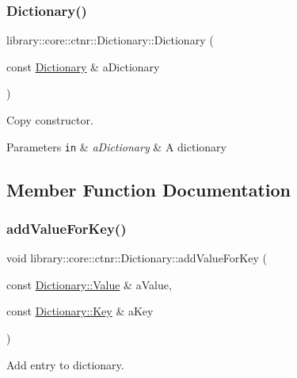 \subsubsection{\texorpdfstring{Dictionary()}{Dictionary()}\hspace{0.1cm}{\footnotesize\ttfamily [2/2]}}
{\footnotesize\ttfamily library\+::core\+::ctnr\+::\+Dictionary\+::\+Dictionary (\begin{DoxyParamCaption}\item[{const \hyperlink{classlibrary_1_1core_1_1ctnr_1_1_dictionary}{Dictionary} \&}]{a\+Dictionary }\end{DoxyParamCaption})}



Copy constructor. 


\begin{DoxyParams}[1]{Parameters}
\mbox{\tt in}  & {\em a\+Dictionary} & A dictionary \\
\hline
\end{DoxyParams}


\subsection{Member Function Documentation}
\mbox{\label{classlibrary_1_1core_1_1ctnr_1_1_dictionary_adea5ef8c3d55b94a219f19cb0100be4b}} 
\subsubsection{\texorpdfstring{add\+Value\+For\+Key()}{addValueForKey()}}
{\footnotesize\ttfamily void library\+::core\+::ctnr\+::\+Dictionary\+::add\+Value\+For\+Key (\begin{DoxyParamCaption}\item[{const \hyperlink{classlibrary_1_1core_1_1ctnr_1_1_object}{Dictionary\+::\+Value} \&}]{a\+Value,  }\item[{const \hyperlink{classlibrary_1_1core_1_1types_1_1_string}{Dictionary\+::\+Key} \&}]{a\+Key }\end{DoxyParamCaption})}



Add entry to dictionary. 


